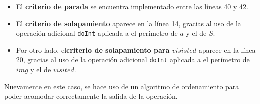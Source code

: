 \begin{itemize}
    \item El \textbf{criterio de parada} se encuentra implementado entre las líneas 40 y 42.
    
    \item El \textbf{criterio de solapamiento} aparece en la línea 14, gracias al uso de la operación adicional \texttt{doInt} aplicada a el perímetro de $a$ y el de $S$.

    \item Por otro lado, el\textbf{criterio de solapamiento para $visisted$} aparece en la línea 20, gracias al uso de la operación adicional \texttt{doInt} aplicada a el perímetro de $img$ y el de $visited$.
\end{itemize}

Nuevamente en este caso, se hace uso de un algoritmo de ordenamiento para poder acomodar correctamente la salida de la operación.

